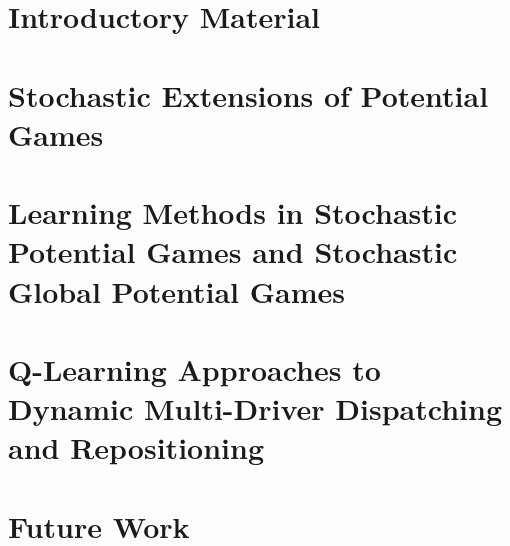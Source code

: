 \documentclass[12pt,oneside]{report}
\begin{document}

\onehalfspacing %

\chapter{Introductory Material}
\label{intro}


\chapter{Stochastic Extensions of Potential Games}
\label{spg}



\chapter{Learning Methods in Stochastic Potential Games and Stochastic Global Potential Games}
\label{rmsg}


\chapter{Q-Learning Approaches to Dynamic Multi-Driver Dispatching and Repositioning}
\label{mddqn}


\chapter{Future Work}
\label{futurework}



%

\singlespacing


\end{document}
